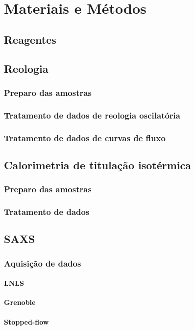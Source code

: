 \documentclass[a4paper, 10pt]{book}
\begin{document}
\part{Materiais e Métodos}
	\chapter{Reagentes}
	\chapter{Reologia}
		\section{Preparo das amostras}
		\section{Tratamento de dados de reologia oscilatória}
		\section{Tratamento de dados de curvas de fluxo}
	\chapter{Calorimetria de titulação isotérmica}
		\section{Preparo das amostras}
		\section{Tratamento de dados}
	\chapter{SAXS}
		\section{Aquisição de dados}
			\subsection{LNLS}
			\subsection{Grenoble}
			\subsection{Stopped-flow}
\end{document}
